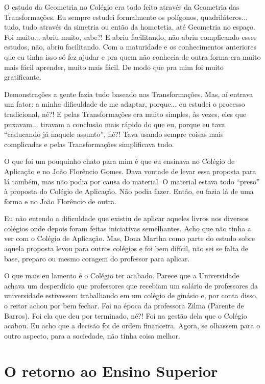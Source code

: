 \documentclass{hipatia}
\begin{document}
O estudo da Geometria no Colégio era todo feito através da Geometria das
Transformações. Eu sempre estudei formalmente os polígonos,
quadriláteros... tudo, tudo através da simetria ou então da homotetia,
até Geometria no espaço. Foi muito... abriu muito, sabe?! E abriu
facilitando, não abriu complicando esses estudos, não, abriu
facilitando. Com a maturidade e os conhecimentos anteriores que eu tinha
isso só fez ajudar e pra quem não conhecia de outra forma era muito mais
fácil aprender, muito mais fácil. De modo que pra mim foi muito
gratificante.

Demonstrações a gente fazia tudo baseado nas Transformações. Mas, aí
entrava um fator: a minha dificuldade de me adaptar, porque... eu
estudei o processo tradicional, né?! E pelas Transformações era muito
simples, às vezes, eles que puxavam... tiravam a conclusão mais rápido
do que eu, porque eu tava ``caducando já naquele assunto'', né?! Tava
usando sempre coisas mais complicadas e pelas Transformações
simplificava tudo.

O que foi um pouquinho chato para mim é que eu ensinava no Colégio de 
Aplicação e no João Florêncio Gomes. Dava vontade de levar essa proposta
para lá também, mas não podia por causa do material. O material estava
todo ``preso'' à proposta do Colégio de Aplicação. Não podia fazer.
Então, eu fazia lá de uma forma e no João Florêncio de outra.

Eu não entendo a dificuldade que existiu de aplicar aqueles livros nos
diversos colégios onde depois foram feitas iniciativas semelhantes. Acho
que não tinha a ver com o Colégio de Aplicação. Mas, Dona Martha como
parte do estudo sobre aquela proposta levou para outros colégios e foi
bem difícil, não sei se falta de base, preparo ou mesmo coragem do
professor para aplicar.

O que mais eu lamento é o Colégio ter acabado. Parece que a Universidade
achava um desperdício que professores que recebiam um salário de
professores da universidade estivessem trabalhando em um colégio de
ginásio e, por conta disso, o reitor achou por bem fechar. Foi na época
da professora Zilma (Parente de Barros). Foi ela que deu por terminado,
né?! Foi na gestão dela que o Colégio acabou. Eu acho que a decisão foi
de ordem financeira. Agora, se olhassem para o outro aspecto, para a
sociedade, não tinha coisa melhor.

\section{O retorno ao %
Ensino Superior}
\end{document}
